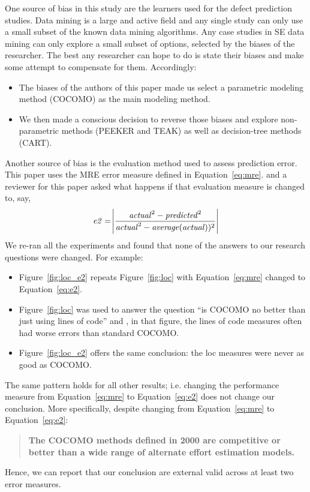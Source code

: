 \documentclass[smallcondesed]{svjour3}
\newcommand{\bi}{\begin{itemize}[leftmargin=0.4cm]}
\newcommand{\ei}{\end{itemize}}
\newcommand{\fig}[1]{Figure~\ref{fig:#1}}
\newcommand{\eq}[1]{Equation~\ref{eq:#1}}
\newenvironment{BLUE}{\color{blue}}{\ignorespacesafterend}
\begin{document}
One source of bias in this study
are the learners used for the defect prediction
studies. Data mining is a large and active field and
any single study can only use a small subset of the
known data mining algorithms.
Any case studies
in SE data mining  can only explore a small
subset of options, selected by the biases of the researcher. The best any researcher
can hope to do is state their biases and make some attempt to compensate for them.
Accordingly:
\bi
\item
The
biases of the authors of this paper made us select
a parametric modeling method (COCOMO)  as the main modeling method.
\item
We then made a conscious decision to reverse those biases
and explore non-parametric methods (PEEKER and TEAK) as well
as decision-tree methods (CART).
\ei
\begin{BLUE}

Another source of bias is the evaluation method used to assess 
prediction error. This paper uses
the MRE error measure defined in \eq{mre}.
and a reviewer for this paper asked 
what happens if that evaluation measure
is changed to, say,
\begin{equation}\label{eq:e2}
\mathit{e2}=\abs{\frac{ \mathit{actual}^2 - \mathit{predicted}^2}{\mathit{actual}^2 - \mathit{average(actual)})^2}}
\end{equation}
We re-ran all the experiments and found that none of the answers to our research questions were changed.
For example:
\bi
\item
\fig{loc_e2} repeats \fig{loc} with 
\eq{mre} changed to \eq{e2}. 
\item
\fig{loc} was used to answer the question ``is COCOMO no better than just
using lines of code'' and , in that figure, the lines of code measures
often had worse errors than standard COCOMO.
\item
\fig{loc_e2} offers the same conclusion: the loc measures were never
as good as COCOMO.
\ei
The same pattern holds for all other results; i.e. changing
the performance measure from \eq{mre} to  \eq{e2} does
not change our conclusion. More specifically,
despite changing from \eq{mre} to  \eq{e2}:
\begin{quote}
    \textbf{The COCOMO methods defined in 2000 are competitive or better than a wide range of alternate  effort estimation models.}
\end{quote}

Hence, we can report that our
conclusion are external valid across at least two error measures.
\end{BLUE}
\end{document}
